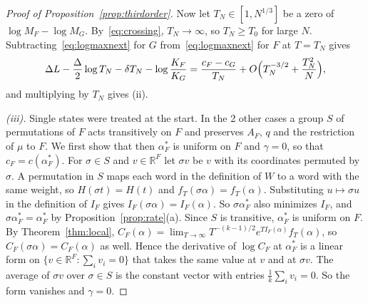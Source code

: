 \begin{proof}[Proof of Proposition~\ref{prop:thirdorder}]
Now let $T_N\in[1,N^{1/3}]$ be a zero of $\log M_F-\log M_G$.
By~\eqref{eq:crossing}, $T_N\to\infty$, so $T_N\ge T_0$ for large $N$.
Subtracting~\eqref{eq:logmaxnext} for $G$ from~\eqref{eq:logmaxnext} for $F$
at $T=T_N$ gives
\[
\Delta L-\frac\Delta2\log T_N-\delta T_N-\log\frac{K_F}{K_G}
=\frac{c_F-c_G}{T_N}+O\Bigl(T_N^{-3/2}+\frac{T_N^2}N\Bigr),
\]
and multiplying by $T_N$ gives (ii).

\emph{(iii).} Single states were treated at the start. In the 2 other cases a
group $S$ of permutations of $F$ acts transitively on $F$ and preserves $A_F$,
$q$ and the restriction of $\mu$ to $F$. We first show that then $\alpha^*_F$
is uniform on $F$ and $\gamma=0$, so that $c_F=c(\alpha^*_F)$. For
$\sigma\in S$ and $v\in\mathbb R^F$ let $\sigma v$ be $v$ with its coordinates
permuted by $\sigma$. A permutation in $S$ maps each word in the definition of
$W$ to a word with the same weight, so $H(\sigma t)=H(t)$ and
$f_T(\sigma\alpha)=f_T(\alpha)$. Substituting $u\mapsto\sigma u$ in the
definition of $I_F$ gives $I_F(\sigma\alpha)=I_F(\alpha)$. So
$\sigma\alpha^*_F$ also minimizes $I_F$, and $\sigma\alpha^*_F=\alpha^*_F$ by
Proposition~\ref{prop:rate}(a). Since $S$ is transitive, $\alpha^*_F$ is
uniform on $F$. By Theorem~\ref{thm:local},
$C_F(\alpha)=\lim_{T\to\infty}T^{-(k-1)/2}e^{TI_F(\alpha)}f_T(\alpha)$, so
$C_F(\sigma\alpha)=C_F(\alpha)$ as well. Hence the derivative of $\log C_F$ at
$\alpha^*_F$ is a linear form on $\{v\in\mathbb R^F:\sum_iv_i=0\}$ that takes
the same value at $v$ and at $\sigma v$. The average of $\sigma v$ over
$\sigma\in S$ is the constant vector with entries $\frac1k\sum_iv_i=0$. So the
form vanishes and $\gamma=0$.


\end{proof}
